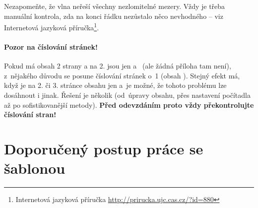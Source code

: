 Nezapomeňte, že vlna neřeší všechny nezlomitelné mezery. Vždy je třeba manuální kontrola, zda na konci řádku nezůstalo něco nevhodného -- viz Internetová jazyková příručka\footnote{Internetová jazyková příručka \url{http://prirucka.ujc.cas.cz/?id=880}}.

\paragraph {Pozor na číslování stránek!} Pokud má obsah 2 strany a na 2. jsou jen  a~ (ale žádná příloha tam není), z~nějakého důvodu se posune číslování stránek o~1 (obsah ). Stejný efekt má, když je na 2. či 3. stránce obsahu jen  a~je možné, že tohoto problému lze dosáhnout i jinak. Řešení je několik (od~úpravy obsahu, přes nastavení počítadla až po sofistikovanější metody). \textbf{Před odevzdáním proto vždy překontrolujte číslování stran!}


\section*{Doporučený postup práce se šablonou}

